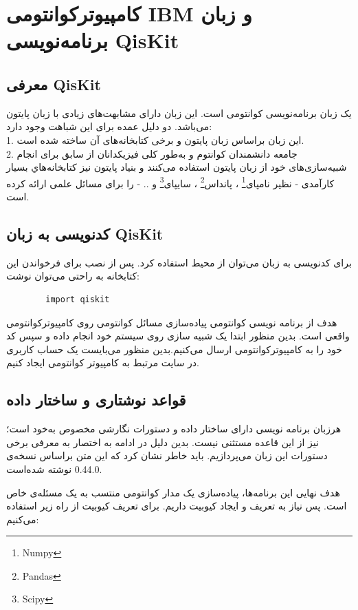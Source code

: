 \documentclass{book}
\begin{document}
\section{کامپیوترکوانتومی IBM و زبان برنامه‌نویسی QisKit}\label{sec:Qiskit}

\subsection{معرفی QisKit}
یک زبان برنامه‌نویسی کوانتومی است. این زبان دارای مشابهت‌های زیادی با زبان پایتون می‌باشد. دو دلیل عمده برای این شباهت وجود دارد:\\
 1. این زبان براساس زبان پایتون و برخی کتابخانه‌های آن ساخته شده است. \\
 2. جامعه دانشمندان کوانتوم و به‌طور کلی فیزیکدانان از سابق برای انجام شبیه‌سازی‌های خود از زبان پایتون استفاده می‌کنند و بنیاد پایتون نیز کتابخانه‌هاي بسیار کارآمدی - نظیر نامپای\footnote{Numpy} ، پانداس\footnote{Pandas} ، سایپای\footnote{Scipy} و .. - را برای مسائل علمی ارائه کرده است.

\subsection{کدنویسی به زبان QisKit}
برای کدنویسی به زبان  می‌توان از محیط  استفاده کرد. پس از نصب  برای فرخواندن این کتابخانه به راحتی می‌توان نوشت:

\begin{latin}
	\begin{verbatim}
		import qiskit
	\end{verbatim}
\end{latin}

هدف از برنامه نویسی کوانتومی پیاده‌سازی مسائل کوانتومی روی کامپیوتر‌کوانتومی‌ واقعی است. بدین منظور ابتدا یک شبیه سازی روی سیستم خود انجام داده و سپس کد خود را به کامپیوتر‌کوانتومی  ارسال می‌کنیم.بدین منظور می‌بایست یک حساب کاربری در سایت مرتبط به کامپیوتر کوانتومی  ایجاد کنیم.


\subsection{قواعد نوشتاری و ساختار داده}
هرزبان برنامه نویسی دارای ساختار داده و دستورات نگارشی مخصوص به‌خود است؛  نیز از این قاعده مستثنی نیست. بدین دلیل در ادامه به اختصار به معرفی برخی دستورات این زبان می‌پردازیم. باید خاطر نشان کرد که این متن براساس  نسخه‌ی  0.44.0 نوشته‌ شده‌است.

هدف نهایی این برنامه‌ها، پیاده‌سازی یک مدار کوانتومی‌ منتسب به یک مسئله‌ی خاص است. پس نیاز به تعریف و ایجاد کیوبیت داریم. برای تعریف کیوبیت از راه زیر استفاده می‌کنیم:
\end{document}
